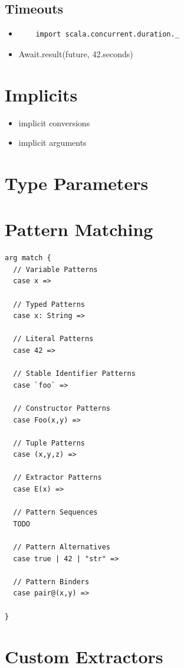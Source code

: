 \documentclass[10pt,landscape,a4paper]{article}
\begin{document}
\begin{multicols*}{4}
\subsection{Timeouts}
\begin{itemize}
\item
  \begin{verbatim}
    import scala.concurrent.duration._
  \end{verbatim}
\item Await.result(future, 42.seconds)
\end{itemize}

\section{Implicits}
\begin{itemize}
\item implicit conversions
\item implicit arguments
\end{itemize}

\section{Type Parameters}

\section{Pattern Matching}
\begin{verbatim}
arg match {
  // Variable Patterns
  case x =>

  // Typed Patterns
  case x: String =>

  // Literal Patterns
  case 42 =>

  // Stable Identifier Patterns
  case `foo` =>

  // Constructor Patterns
  case Foo(x,y) =>

  // Tuple Patterns
  case (x,y,z) =>

  // Extractor Patterns
  case E(x) =>

  // Pattern Sequences
  TODO

  // Pattern Alternatives
  case true | 42 | "str" =>

  // Pattern Binders
  case pair@(x,y) =>

}
\end{verbatim}

\section{Custom Extractors}


\end{multicols*}
\end{document}
